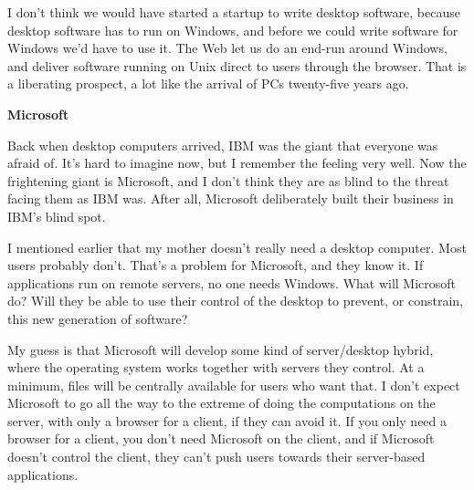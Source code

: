 I don't think we would have started a startup to write desktop software,
because desktop software has to run on Windows, and before we could
write software for Windows we'd have to use it. The Web let us do an
end-run around Windows, and deliver software running on Unix direct to
users through the browser. That is a liberating prospect, a lot like the
arrival of PCs twenty-five years ago.

\textbf{Microsoft}

Back when desktop computers arrived, IBM was the giant that everyone was
afraid of. It's hard to imagine now, but I remember the feeling very
well. Now the frightening giant is Microsoft, and I don't think they are
as blind to the threat facing them as IBM was. After all, Microsoft
deliberately built their business in IBM's blind spot.

I mentioned earlier that my mother doesn't really need a desktop
computer. Most users probably don't. That's a problem for Microsoft, and
they know it. If applications run on remote servers, no one needs
Windows. What will Microsoft do? Will they be able to use their control
of the desktop to prevent, or constrain, this new generation of
software?

My guess is that Microsoft will develop some kind of server/desktop
hybrid, where the operating system works together with servers they
control. At a minimum, files will be centrally available for users who
want that. I don't expect Microsoft to go all the way to the extreme of
doing the computations on the server, with only a browser for a client,
if they can avoid it. If you only need a browser for a client, you don't
need Microsoft on the client, and if Microsoft doesn't control the
client, they can't push users towards their server-based applications.

